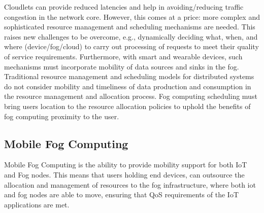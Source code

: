 Cloudlets can provide reduced latencies and help in avoiding/reducing traffic congestion in the network core. However, this comes at a price: more complex and sophisticated resource management and scheduling mechanisms are needed. This raises new challenges to be overcome, e.g., dynamically deciding what, when, and where (device/fog/cloud) to carry out processing of requests to meet their quality of service requirements. Furthermore, with smart and wearable devices, such mechanisms must incorporate mobility of data sources and sinks in the fog. Traditional resource management and scheduling models for distributed systems do not consider mobility and timeliness of data production and consumption in the resource management and allocation process. Fog computing scheduling must bring users location to the resource allocation policies to uphold the benefits of fog computing proximity to the user.

\vfill\pagebreak
\subsection{Mobile Fog Computing}
\label{sec:Mobility}
Mobile Fog Computing is the ability to provide mobility support for both IoT and Fog nodes. This means that users holding end devices, can outsource the allocation and management of resources to the fog infrastructure, where both iot and fog nodes are able to move, ensuring that QoS requirements of the IoT applications are met.\\

